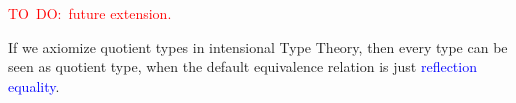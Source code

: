 \documentclass[envcountsame]{llncs}
\newcommand{\todo}[1]{\textcolor{red}{TO~DO:~#1}}
\newcommand{\ed}[1]{\textcolor{blue}{#1}}
\newcommand{\itt}{intensional Type Theory}
\begin{document}
\todo{future extension.}

% 

If we axiomize quotient types in \itt, then every type can be seen as quotient type, when the default equivalence relation is just \ed{reflection equality}.
\newpage


\end{document}
